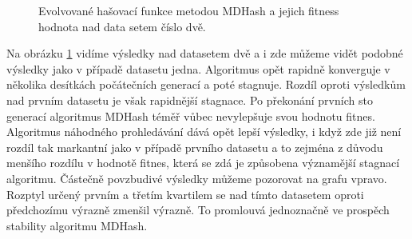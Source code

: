 \begin{figure}[!ht]
	\centering
	\caption{Evolvované hašovací funkce metodou MDHash a jejich fitness hodnota nad data setem číslo dvě.}
	\label{fig:MDComparison2}
\end{figure}

Na obrázku \ref{fig:MDComparison2} vidíme výsledky nad datasetem dvě a i zde můžeme vidět podobné výsledky jako v případě datasetu
jedna. Algoritmus opět rapidně konverguje v několika desítkách počátečních generací a poté stagnuje. Rozdíl oproti výsledkům nad prvním
datasetu je však rapidnější stagnace. Po překonání prvních sto generací algoritmus MDHash téměř vůbec nevylepšuje svou hodnotu fitnes.
Algoritmus náhodného prohledávání dává opět lepší výsledky, i když zde již není rozdíl tak markantní jako v případě prvního datasetu a to 
zejména z důvodu menšího rozdílu v hodnotě fitnes, která se zdá je způsobena významější stagnací algoritmu. Částečně povzbudivé výsledky
můžeme pozorovat na grafu vpravo. Rozptyl určený prvním a třetím kvartilem se nad tímto datasetem oproti předchozímu výrazně zmenšil
výrazně. To promlouvá jednoznačně ve prospěch stability algoritmu MDHash.

